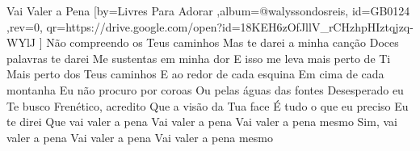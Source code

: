 \beginsong
{Vai Valer a Pena %
}[by={Livres Para Adorar %
},album={@walyssondosreis},
id={GB0124 %
},rev={0}, %
qr={https://drive.google.com/open?id=18KEH6zOfJllV_rCHzhpHIztqjzq-WYlJ %
}]
\beginverse*
Não compreendo os Teus caminhos
Mas te darei a minha canção
Doces palavras te darei
Me sustentas em minha dor
E isso me leva mais perto de Ti
Mais perto dos Teus caminhos
\endverse
\beginverse*
E ao redor de cada esquina
Em cima de cada montanha
Eu não procuro por coroas
Ou pelas águas das fontes
Desesperado eu Te busco
Frenético, acredito
Que a visão da Tua face
É tudo o que eu preciso
\endverse
\beginchorus
Eu te direi
Que vai valer a pena
Vai valer a pena
Vai valer a pena mesmo
Sim, vai valer a pena
Vai valer a pena
Vai valer a pena mesmo
\endchorus

\begin{comment}
\lstset{basicstyle=\scriptsize\bf} %
\tab{Solo 1}
\begin{lstlisting}
E|-----------------------------------------------------|
B|-----------------------------------------------------|
G|-----------------------------------------------------|
D|-----------------------------------------------------|
A|-----------------------------------------------------|
E|-----------------------------------------------------|
\end{lstlisting}
\end{comment}
 
